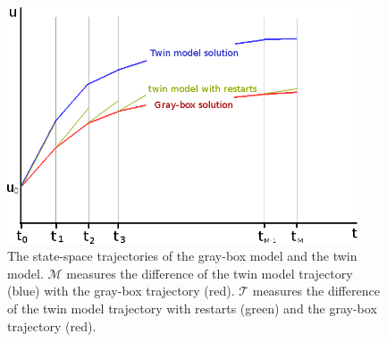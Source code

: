\begin{figure}[htbp]\begin{center}
    \includegraphics[height=7cm]{../sketch2.png}
    \caption{The state-space trajectories of the gray-box model and the twin model. 
             $\mathcal{M}$ measures the difference of the twin model trajectory (blue) with
             the gray-box trajectory (red). $\mathcal{T}$ measures the difference of the
             twin model trajectory with restarts (green) and the gray-box trajectory (red).}
    \label{fig:sketch}
\end{center}\end{figure}

